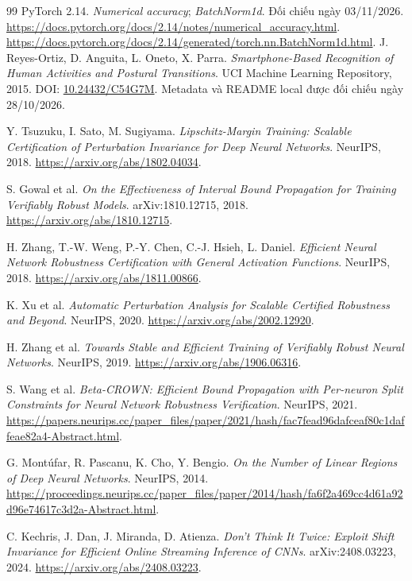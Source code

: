 \documentclass[11pt,a4paper]{article}
\theoremstyle{remark}
\begin{document}
\begingroup\small
\begin{thebibliography}{99}
 PyTorch 2.14. \emph{Numerical accuracy};
\emph{BatchNorm1d}. Đối chiếu ngày 03/11/2026.
\url{https://docs.pytorch.org/docs/2.14/notes/numerical_accuracy.html}.
\url{https://docs.pytorch.org/docs/2.14/generated/torch.nn.BatchNorm1d.html}.
 J. Reyes-Ortiz, D. Anguita, L. Oneto, X. Parra.
\emph{Smartphone-Based Recognition of Human Activities and Postural
Transitions}. UCI Machine Learning Repository, 2015.
DOI: \href{https://doi.org/10.24432/C54G7M}{10.24432/C54G7M}.
Metadata và README local được đối chiếu ngày 28/10/2026.

 Y. Tsuzuku, I. Sato, M. Sugiyama.
\emph{Lipschitz-Margin Training: Scalable Certification of Perturbation
Invariance for Deep Neural Networks}. NeurIPS, 2018.
\url{https://arxiv.org/abs/1802.04034}.

 S. Gowal et al.
\emph{On the Effectiveness of Interval Bound Propagation for Training
Verifiably Robust Models}. arXiv:1810.12715, 2018.
\url{https://arxiv.org/abs/1810.12715}.

 H. Zhang, T.-W. Weng, P.-Y. Chen, C.-J. Hsieh, L. Daniel.
\emph{Efficient Neural Network Robustness Certification with General
Activation Functions}. NeurIPS, 2018.
\url{https://arxiv.org/abs/1811.00866}.

 K. Xu et al.
\emph{Automatic Perturbation Analysis for Scalable Certified Robustness
and Beyond}. NeurIPS, 2020.
\url{https://arxiv.org/abs/2002.12920}.

 H. Zhang et al.
\emph{Towards Stable and Efficient Training of Verifiably Robust Neural
Networks}. NeurIPS, 2019.
\url{https://arxiv.org/abs/1906.06316}.

 S. Wang et al.
\emph{Beta-CROWN: Efficient Bound Propagation with Per-neuron Split
Constraints for Neural Network Robustness Verification}. NeurIPS, 2021.
\url{https://papers.neurips.cc/paper_files/paper/2021/hash/fac7fead96dafceaf80c1daffeae82a4-Abstract.html}.

 G. Mont\'ufar, R. Pascanu, K. Cho, Y. Bengio.
\emph{On the Number of Linear Regions of Deep Neural Networks}.
NeurIPS, 2014.
\url{https://proceedings.neurips.cc/paper_files/paper/2014/hash/fa6f2a469cc4d61a92d96e74617c3d2a-Abstract.html}.

 C. Kechris, J. Dan, J. Miranda, D. Atienza.
\emph{Don't Think It Twice: Exploit Shift Invariance for Efficient Online
Streaming Inference of CNNs}. arXiv:2408.03223, 2024.
\url{https://arxiv.org/abs/2408.03223}.


\end{thebibliography}
\end{document}
